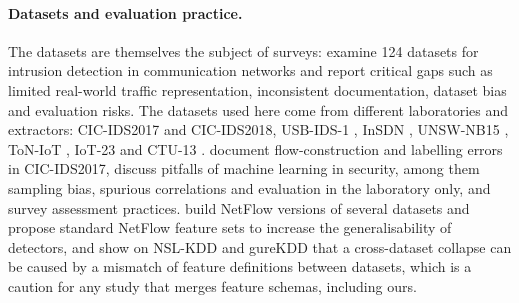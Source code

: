 \documentclass[11pt]{article}
\begin{document}
\paragraph{Datasets and evaluation practice.}
The datasets are themselves the subject of surveys: \citet{ashraf2026survey} examine 124 datasets for intrusion detection in communication networks and report critical gaps such as limited real-world traffic representation, inconsistent documentation, dataset bias and evaluation risks.
The datasets used here come from different laboratories and extractors: CIC-IDS2017 \citep{sharafaldin2018cicids} and CIC-IDS2018, USB-IDS-1 \citep{catillo2021usbids1,catillo2025usbidstc}, InSDN \citep{elsayed2020insdn}, UNSW-NB15 \citep{moustafa2015unsw}, ToN-IoT \citep{alsaedi2020toniot}, IoT-23 \citep{garcia2020iot23} and CTU-13 \citep{garcia2014ctu13}.
\citet{engelen2021troubleshooting} document flow-construction and labelling errors in CIC-IDS2017, \citet{arp2022dos} discuss pitfalls of machine learning in security, among them sampling bias, spurious correlations and evaluation in the laboratory only, and \citet{apruzzese2023sok} survey assessment practices.
\citet{sarhan2021netflow,sarhan2022standard,sarhan2022evaluating} build NetFlow versions of several datasets and propose standard NetFlow feature sets to increase the generalisability of detectors, and \citet{alriyami2021cross} show on NSL-KDD and gureKDD that a cross-dataset collapse can be caused by a mismatch of feature definitions between datasets, which is a caution for any study that merges feature schemas, including ours.
\end{document}
